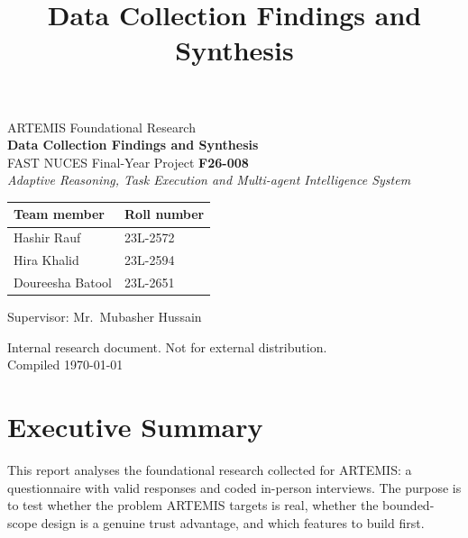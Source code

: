 \documentclass[11pt]{article}
\title{\vspace{-1.5em}\textbf{Data Collection Findings and Synthesis}}
\author{}
\date{}
\begin{document}
\begin{titlepage}
\centering
\vspace*{2.2cm}
{\Large ARTEMIS Foundational Research}\\[0.4cm]
{\LARGE\bfseries Data Collection Findings and Synthesis}\\[0.6cm]
{\large FAST NUCES Final-Year Project \textbf{F26-008}}\\[0.2cm]
{\small \textit{Adaptive Reasoning, Task Execution and Multi-agent Intelligence System}}\\[1.6cm]

\begin{tabular}{@{}ll@{}}
\toprule
Team member & Roll number \\
\midrule
Hashir Rauf & 23L-2572 \\
Hira Khalid & 23L-2594 \\
Doureesha Batool & 23L-2651 \\
\bottomrule
\end{tabular}

\vspace{0.9cm}

{\normalsize Supervisor: Mr.\ Mubasher Hussain}

\vfill
{\normalsize Internal research document. Not for external distribution.}\\[0.3cm]
{\normalsize Compiled \today}
\end{titlepage}

\setcounter{page}{1}
\tableofcontents
\vspace{1em}
\listoffigures
\clearpage
{}
\setcounter{page}{1}

\section{Executive Summary}

This report analyses the foundational research collected for ARTEMIS: a questionnaire with
\Nresp{} valid responses and \Niv{} coded in-person interviews. The purpose is to test whether
the problem ARTEMIS targets is real, whether the bounded-scope design is a genuine trust
advantage, and which features to build first.
\end{document}
